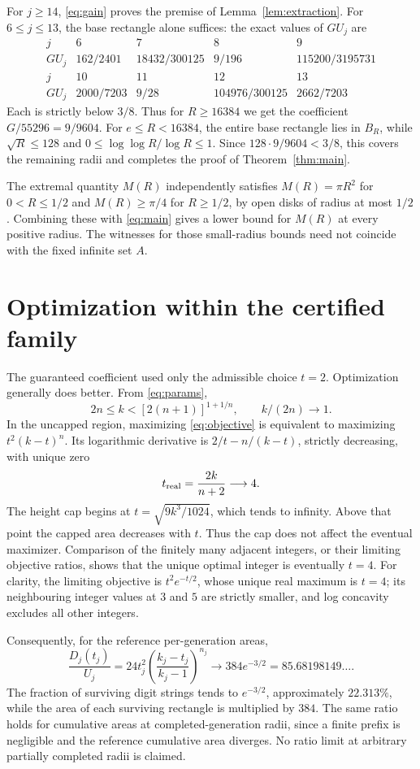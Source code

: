 \documentclass[11pt,a4paper]{article}
\theoremstyle{remark}\newtheorem{remark}[theorem]{Remark}
\begin{document}
For $j\ge14$, \eqref{eq:gain} proves the premise of
Lemma~\ref{lem:extraction}. For $6\le j\le13$, the base rectangle alone
suffices: the exact values of $GU_j$ are
\[
\begin{array}{c|rrrr}
j&6&7&8&9\\\hline
GU_j&162/2401&18432/300125&9/196&115200/3195731\\[2pt]
j&10&11&12&13\\\hline
GU_j&2000/7203&9/28&104976/300125&2662/7203
\end{array}
\]
Each is strictly below $3/8$. Thus for $R\ge16384$ we get the coefficient
$G/55296=9/9604$. For $e\le R<16384$, the entire base rectangle lies in
$B_R$, while $\sqrt R\le128$ and $0\le\log\log R/\log R\le1$.
Since $128\cdot9/9604<3/8$, this covers the remaining radii and completes
the proof of Theorem~\ref{thm:main}.

The extremal quantity $M(R)$ independently satisfies $M(R)=\pi R^2$ for
$0<R\le1/2$ and $M(R)\ge\pi/4$ for $R\ge1/2$, by open disks of radius
at most $1/2$. Combining these with \eqref{eq:main} gives a lower bound for
$M(R)$ at every positive radius. The witnesses for those small-radius
bounds need not coincide with the fixed infinite set $A$.

\section{Optimization within the certified family}\label{sec:optimality}
The guaranteed coefficient used only the admissible choice $t=2$.
Optimization generally does better. From \eqref{eq:params},
\[
 2n\le k<[2(n+1)]^{1+1/n},\qquad k/(2n)\longrightarrow1.
\]
In the uncapped region, maximizing \eqref{eq:objective} is equivalent to
maximizing $t^2(k-t)^n$. Its logarithmic derivative is
$2/t-n/(k-t)$, strictly decreasing, with unique zero
\[
 t_{\rm real}=\frac{2k}{n+2}\longrightarrow4.
\]
The height cap begins at $t=\sqrt{9k^3/1024}$, which tends to infinity.
Above that point the capped area decreases with $t$. Thus the cap does not
affect the eventual maximizer. Comparison of the finitely many adjacent
integers, or their limiting objective ratios, shows that the unique optimal
integer is eventually $t=4$. For clarity, the limiting objective is
$t^2e^{-t/2}$, whose unique real maximum is $t=4$; its neighbouring integer
values at $3$ and $5$ are strictly smaller, and log concavity excludes all
other integers.

Consequently, for the reference per-generation areas,
\[
 \frac{D_j(t_j)}{U_j}
 =24t_j^2\left(\frac{k_j-t_j}{k_j-1}\right)^{n_j}
 \longrightarrow384e^{-3/2}=85.68198149\ldots.
\]
The fraction of surviving digit strings tends to $e^{-3/2}$, approximately
$22.313\%$, while the area of each surviving rectangle is multiplied by
$384$. The same ratio holds for cumulative areas at completed-generation
radii, since a finite prefix is negligible and the reference cumulative
area diverges. No ratio limit at arbitrary partially completed radii is
claimed.
\end{document}
